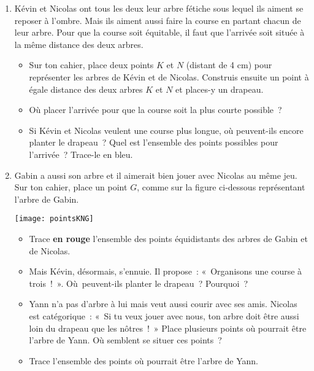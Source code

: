 \begin{exercice}
\begin{enumerate}
 \item Kévin et Nicolas ont tous les deux leur arbre fétiche sous lequel ils aiment se reposer à l'ombre. Mais ils aiment aussi faire la course en partant chacun de leur arbre. Pour que la course soit équitable, il faut que l'arrivée soit située à la même distance des deux arbres.
 \begin{itemize}
  \item Sur ton cahier, place deux points $K$ et $N$ (distant de 4 cm) pour représenter les arbres de Kévin et de Nicolas. Construis ensuite un point à égale distance des deux arbres $K$ et $N$ et places-y un drapeau.
  \item Où placer l'arrivée pour que la course soit la plus courte possible ?
  \item Si Kévin et Nicolas veulent une course plus longue, où peuvent-ils encore planter le drapeau ? Quel est l'ensemble des points possibles pour l'arrivée ? Trace-le en bleu. 
  \end{itemize}
 \item Gabin a aussi son arbre et il aimerait bien jouer avec Nicolas au même jeu. Sur ton cahier, place un point $G$, comme sur la figure ci-dessous représentant l'arbre de Gabin.
 \begin{center} \texttt{[image: pointsKNG]} \end{center}
 \begin{itemize}
  \item Trace \textbf{\textcolor{B2}{en rouge}} l'ensemble des points équidistants des arbres de Gabin et de Nicolas.
  \item Mais Kévin, désormais, s'ennuie. Il propose : « Organisons une course à trois ! ». Où peuvent-ils planter le drapeau ? Pourquoi ? 
  \item Yann n'a pas d'arbre à lui mais veut aussi courir avec ses amis. Nicolas est catégorique : « Si tu veux jouer avec nous, ton arbre doit être aussi loin du drapeau que les nôtres ! » Place plusieurs points où pourrait être l'arbre de Yann. Où semblent se situer ces points ? 
  \item Trace l'ensemble des points où pourrait être l'arbre de Yann.
  \end{itemize}
 \end{enumerate}
\end{exercice}
